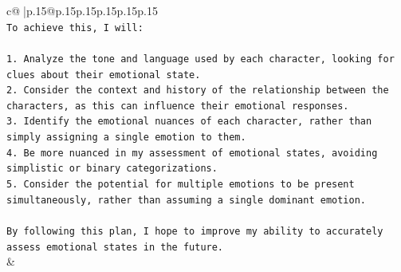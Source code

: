 \documentclass{article}
\begin{document}
{\begin{supertabular}{c@{$\;$}|p{.15\linewidth}@{}p{.15\linewidth}p{.15\linewidth}p{.15\linewidth}p{.15\linewidth}p{.15\linewidth}}
{{{\\ 
\texttt{To achieve this, I will:} \\
\\ 
\texttt{1. Analyze the tone and language used by each character, looking for clues about their emotional state.} \\
\texttt{2. Consider the context and history of the relationship between the characters, as this can influence their emotional responses.} \\
\texttt{3. Identify the emotional nuances of each character, rather than simply assigning a single emotion to them.} \\
\texttt{4. Be more nuanced in my assessment of emotional states, avoiding simplistic or binary categorizations.} \\
\texttt{5. Consider the potential for multiple emotions to be present simultaneously, rather than assuming a single dominant emotion.} \\
\\ 
\texttt{By following this plan, I hope to improve my ability to accurately assess emotional states in the future.} \\
            }
        }
    }
    & \\ \\

\end{supertabular}
}
\end{document}
